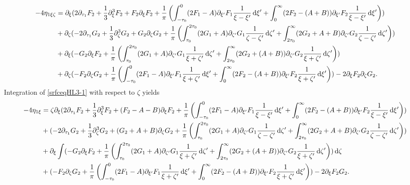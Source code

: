 \documentclass[10pt,reqno,oneside,a4paper, landscape]{article}
\begin{document}
\begin{equation}\label{srfceqHL3-2}
\begin{aligned}
- 4\eta_{1\xi \zeta} &= \partial_\xi (2 \partial_{\tau_1}F_2 + \frac{1}{3} \partial_\xi^3 F_2 + F_2\partial_\xi F_2 + \frac{1}{\pi} \left( \int^0_{-\tau_0} (2 F_1 -A)\partial_{\xi'}F_1\frac{1}{\xi -\xi'} \,\mathrm{d} \xi' + \int^{\infty}_{0} (2 F_2 -  (A+B))\partial_{\xi'} F_2 \frac{1}{\xi -\xi'} \,\mathrm{d} \xi'  \right))  \\
&+ \partial_\zeta(- 2 \partial_{\tau_1} G_2 +  \frac{1}{3} \partial_\zeta^3 G_2+ G_2 \partial_{\zeta} G_2 + \frac{1}{\pi} \left( \int^{2\tau_0}_{\tau_0} (2 G_1 +A)\partial_{\zeta'} G_1 \frac{1}{\zeta -\zeta'} \,\mathrm{d} \zeta' + \int^{\infty}_{2\tau_0} (2 G_2+A+B) \partial_{\zeta'} G_2 \frac{1}{\zeta -\zeta'} \,\mathrm{d} \zeta' \right)) \\
&+ \partial_{\xi}(-G_2 \partial_\xi F_2 + \frac{1}{\pi} \left( \int^{2\tau_0}_{\tau_0} (2 G_1+A) \partial_{\zeta'} G_1 \frac{1}{\xi + \zeta'} \,\mathrm{d} \zeta' + \int^{\infty}_{2\tau_0} (2 G_2 + (A+B) )\partial_{\zeta'} G_2 \frac{1}{\xi + \zeta'} \,\mathrm{d} \zeta'    \right) ) \\
&+ \partial_{\zeta}( -F_2\partial_\zeta G_2+ \frac{1}{\pi} \left(\int^0_{-\tau_0} (2 F_1 - A)\partial_{\xi'} F_1 \frac{1}{\xi + \zeta'} \,\mathrm{d} \xi' + \int^{\infty}_{0} (2 F_2 -(A+B))\partial_{\xi'} F_2 \frac{1}{\xi + \zeta'} \,\mathrm{d} \xi' \right)) - 2 \partial_\xi F_2 \partial_\zeta G_2. 
\end{aligned}
\end{equation}
Integration of \eqref{srfceqHL3-1} with respect to $\zeta$ yields
\begin{equation}
\begin{aligned}
- 4\eta_{1\xi} &= \zeta \partial_\xi (2 \partial_{\tau_1}F_2 + \frac{1}{3} \partial_\xi^3 F_2 + (F_2-A-B)\partial_\xi F_2 + \frac{1}{\pi} \left( \int^0_{-\tau_0} (2 F_1 -A)\partial_{\xi'}F_1\frac{1}{\xi -\xi'} \,\mathrm{d} \xi' + \int^{\infty}_{0} (2 F_2 -  (A+B))\partial_{\xi'} F_2 \frac{1}{\xi -\xi'} \,\mathrm{d} \xi'  \right) )  \\
&+(- 2 \partial_{\tau_1} G_2 +  \frac{1}{3} \partial_\zeta^3 G_2+ (G_2+ A +B) \partial_{\zeta} G_2  + \frac{1}{\pi} \left( \int^{2\tau_0}_{\tau_0} (2 G_1 +A)\partial_{\zeta'} G_1 \frac{1}{\zeta -\zeta'} \,\mathrm{d} \zeta' + \int^{\infty}_{2\tau_0} (2 G_2+A+B) \partial_{\zeta'} G_2 \frac{1}{\zeta -\zeta'} \,\mathrm{d} \zeta' \right) ) \\
&+ \partial_{\xi}\int (-G_2 \partial_\xi F_2 + \frac{1}{\pi}\left( \int^{2\tau_0}_{\tau_0} (2 G_1+A) \partial_{\zeta'} G_1 \frac{1}{\xi + \zeta'} \,\mathrm{d} \zeta' + \int^{\infty}_{2\tau_0} (2 G_2 + (A+B) )\partial_{\zeta'} G_2 \frac{1}{\xi + \zeta'} \,\mathrm{d} \zeta'    \right) )\,\mathrm{d} \zeta \\
&+(-F_2\partial_\zeta G_2 + \frac{1}{\pi} \left(\int^0_{-\tau_0} (2 F_1 - A)\partial_{\xi'} F_1 \frac{1}{\xi + \zeta'} \,\mathrm{d} \xi' + \int^{\infty}_{0} (2 F_2 -(A+B))\partial_{\xi'} F_2 \frac{1}{\xi + \zeta'} \,\mathrm{d} \xi' \right) ) - 2 \partial_\xi F_2 G_2. 
\end{aligned}
\end{equation}
\end{document}
